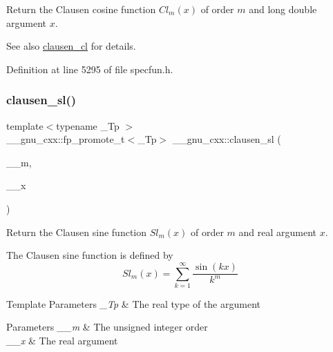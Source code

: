 Return the Clausen cosine function $ Cl_m(x) $ of order $ m $ and {\ttfamily long double} argument $ x $.

\begin{DoxySeeAlso}{See also}
\hyperlink{group__gnu__math__spec__func_ga8786b86db309998f93f877cfb9bdfd57}{clausen\+\_\+cl} for details. 
\end{DoxySeeAlso}


Definition at line 5295 of file specfun.\+h.

\mbox{\label{group__gnu__math__spec__func_gacb757b00309213cd96bb2bc6b5dc3c24}} 
\subsubsection{\texorpdfstring{clausen\+\_\+sl()}{clausen\_sl()}}
{\footnotesize\ttfamily template$<$typename \+\_\+\+Tp $>$ \\
\+\_\+\+\_\+gnu\+\_\+cxx\+::fp\+\_\+promote\+\_\+t$<$\+\_\+\+Tp$>$ \+\_\+\+\_\+gnu\+\_\+cxx\+::clausen\+\_\+sl (\begin{DoxyParamCaption}\item[{unsigned int}]{\+\_\+\+\_\+m,  }\item[{\+\_\+\+Tp}]{\+\_\+\+\_\+x }\end{DoxyParamCaption})\hspace{0.3cm}{\ttfamily [inline]}}

Return the Clausen sine function $ Sl_m(x) $ of order $ m $ and real argument $ x $.

The Clausen sine function is defined by \[ Sl_m(x) = \sum_{k=1}^\infty\frac{\sin(kx)}{k^m} \]


\begin{DoxyTemplParams}{Template Parameters}
{\em \+\_\+\+Tp} & The real type of the argument \\
\hline
\end{DoxyTemplParams}

\begin{DoxyParams}{Parameters}
{\em \+\_\+\+\_\+m} & The unsigned integer order \\
\hline
{\em \+\_\+\+\_\+x} & The real argument \\
\hline
\end{DoxyParams}


